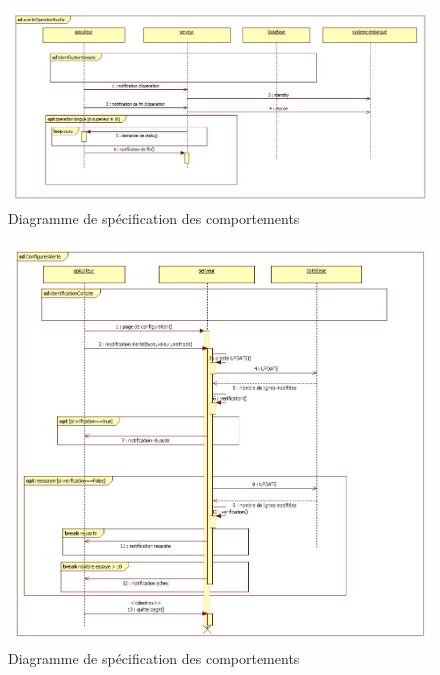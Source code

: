 \begin{figure}[h!]
\centering\includegraphics[scale=0.7]{avertirOperationRuche.jpg}
\caption{\label{fig:sp_comp} Diagramme de spécification des comportements}
\end{figure}
\begin{figure}[h!]
\centering\includegraphics[scale=0.7]{configurerAlerte.jpg}
\caption{\label{fig:sp_comp} Diagramme de spécification des comportements}
\end{figure}
